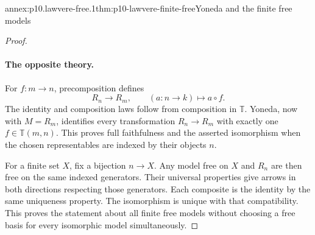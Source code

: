 \begin{annexitem}{annex:p10.lawvere-free.1}{thm:p10-lawvere-finite-free}{Yoneda and the finite free models}
\begin{proof}
\paragraph{The opposite theory.}
For \(f:m\to n\), precomposition defines
\[
 R_n\longrightarrow R_m,
 \qquad (a:n\to k)\longmapsto a\circ f.
\]
The identity and composition laws follow from composition in \(\mathbb T\).
Yoneda, now with \(M=R_m\), identifies every transformation
\(R_n\to R_m\) with exactly one \(f\in\mathbb T(m,n)\).
This proves full faithfulness and the asserted isomorphism when the
chosen representables are indexed by their objects \(n\).

For a finite set \(X\), fix a bijection \(n\to X\).
Any model free on \(X\) and \(R_n\) are then free on the same indexed
generators. Their universal properties give arrows in both directions
respecting those generators. Each composite is the identity by the
same uniqueness property.
The isomorphism is unique with that compatibility.
This proves the statement about all finite free models without choosing
a free basis for every isomorphic model simultaneously.
\end{proof}
\end{annexitem}

